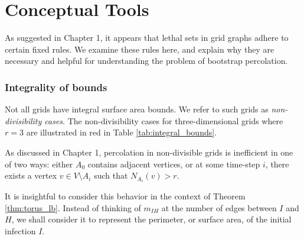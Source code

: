\chapter{Conceptual Tools}

As suggested in Chapter 1, it appears that lethal sets in grid graphs adhere to certain fixed rules. We examine these rules here, and explain why they are necessary and helpful for understanding the problem of bootstrap percolation.

\subsection{Integrality of bounds}

Not all grids have integral surface area bounds. We refer to such grids as \emph{non-divisibility cases}. The non-divisibility cases for three-dimensional grids where $r=3$ are illustrated in red in Table \ref{tab:integral_bounds}. 

As discussed in Chapter 1, percolation in non-divisible grids is inefficient in one of two ways: either $A_0$ contains adjacent vertices, or at some time-step $i$, there exists a vertex $v \in V \setminus A_i$ such that $N_{A_i}(v) > r$. 

It is insightful to consider this behavior in the context of Theorem \ref{thm:torus_lb}. Instead of thinking of $m_{IH}$ at the number of edges between $I$ and $H$, we shall consider it to represent the perimeter, or surface area, of the initial infection $I$. 

